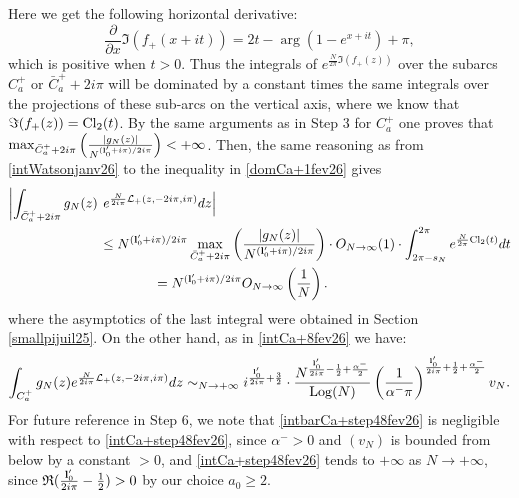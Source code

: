 \documentclass[11pt]{amsart}
\newcommand{\Log}{{\rm Log}}
\begin{document}
Here we get the following horizontal derivative:
$$\dfrac{\partial}{\partial x} \Im (f_+(x+it))  
= 2t - \arg\left (1-e^{x+it}\right )+\pi,$$
which is positive when $t>0$. Thus the integrals of $e^{\frac{N}{2\pi}\Im(f_+(z))}$ over the subarcs $C^+_a$ or $\bar{C}^+_a +2i\pi$ will be dominated by a constant times the same integrals over the projections of these sub-arcs on the vertical axis, where we know that $\Im(f_+(z)) = {\rm Cl}_2(t)$. By the same arguments as in Step 3 for $C_a^+$ one proves that $\textstyle \max_{\bar{C}^+_a +2i\pi}\left(\frac{|g_N(z)|}{N^{({\bf l}_0'+i\pi)/2i\pi}}\right)<+\infty$. Then, the same reasoning as from \eqref{intWatsonjanv26} to the inequality in \eqref{domCa+1fev26} gives
\begin{align}
	\left \vert \int_{\bar{C}^+_a +2i\pi} g_N(z)\right.
 &\left. e^{\frac{N}{2i\pi}\mathcal{L}_+(z,-2i\pi,i\pi)}dz\right \vert \notag
	\\ &\leq  N^{({\bf l}_0'+i\pi)/2i\pi} \max_{\bar{C}^+_a +2i\pi}\left(\frac{|g_N(z)|}{N^{({\bf l}_0'+i\pi)/2i\pi}}\right) \cdot  O_{N\to\infty}(1) \cdot 
	\int_{2\pi-s_N}^{2\pi} e^{\frac{N}{2\pi}{\rm Cl}_2(t)}dt \notag \\
	&\quad \quad \quad \quad = N^{({\bf l}_0'+i\pi)/2i\pi} O_{N\to\infty}\left (\frac{1}{N}\right ).\label{intbarCa+step48fev26}
\end{align}
where the asymptotics of the last integral were obtained in Section \ref{smallpijuil25}. On the other hand, as in \eqref{intCa+8fev26} we have:
\begin{equation}\label{intCa+step48fev26}
 \int_{C_a^+}g_N(z) e^{\frac{N}{2i\pi}\mathcal{L}_+(z,-2i\pi,i\pi)}dz \sim_{N\to +\infty} i^{\frac{{\bf l}_0'}{2i\pi}+\frac{3}{2}}\cdot \dfrac{N^{\frac{{\bf l}_0'}{2i\pi}-\frac{1}{2}+\frac{\alpha^-}{2}}}{\Log(N)} \left(\frac{1}{\alpha^-\pi}\right)^{\frac{{\bf l}_0'}{2i\pi}+\frac{1}{2}+ \frac{\alpha^-}{2}}v_N.
\end{equation}
For future reference in Step 6, we note that \eqref{intbarCa+step48fev26} is negligible with respect to \eqref{intCa+step48fev26}, since $\alpha^->0$ and $(v_N)$ is bounded from below by a constant $>0$, and \eqref{intCa+step48fev26} tends to $+\infty$ as $N\to +\infty$, since $\textstyle \mathfrak{R}(\frac{{\bf l}_0'}{2i\pi}-\frac{1}{2}) >0$ by our choice $a_0\geq 2$.

\
\end{document}
